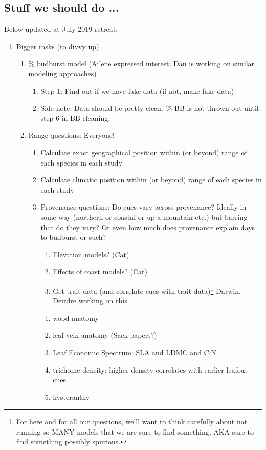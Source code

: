 \documentclass[11pt,letterpaper]{article}
\begin{document}
\subsection{Stuff we should do ...} 
Below updated at July 2019 retreat:
\begin{enumerate}
\item Bigger tasks (to divvy up)
\begin{enumerate}
\item \% budburst model (Ailene expressed interest; Dan is working on similar modeling approaches)
\begin{enumerate}
\item Step 1: Find out if we have fake data (if not, make fake data)
\item Side note: Data should be pretty clean, \% BB is not thrown out until step 6 in BB cleaning.
\end{enumerate}
\item Range questions: Everyone!
\begin{enumerate}
\item Calculate exact geographical position within (or beyond) range of each species in each study
\item Calculate climatic position within (or beyond) range of each species in each study 
\item Provenance questions: Do cues vary across provenance? Ideally in some way (northern or coastal or up a mountain etc.) but barring that do they vary? Or even how much does provenance explain days to budburst or such?
\begin{enumerate}
\item Elevation models? (Cat)
\item Effects of coast models? (Cat)
\item Get trait data (and correlate cues with trait data)\footnote{For here and for all our questions, we'll want to think carefully about not running so MANY models that we are sure to find something, AKA sure to find something possibly spurious.} Darwin, Deirdre working on this.
\end{enumerate}
\begin{enumerate}
\item wood anatomy
\item leaf vein anatomy (Sack papers?)
\item Leaf Economic Spectrum: SLA and LDMC and C:N
\item trichome density: higher density correlates with earlier leafout cues
\item hysteranthy

\end{enumerate}
\end{enumerate}
\end{enumerate}
\end{enumerate}
\end{document}
